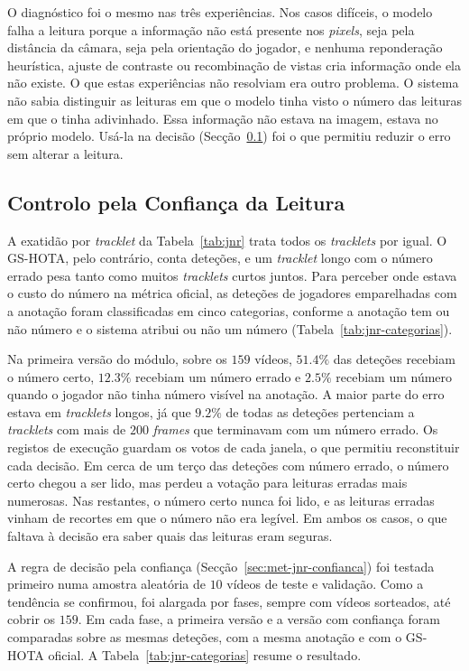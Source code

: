 O diagnóstico foi o mesmo nas três experiências. Nos casos difíceis, o modelo falha a leitura porque a informação não está presente nos \emph{pixels}, seja pela distância da câmara, seja pela orientação do jogador, e nenhuma reponderação heurística, ajuste de contraste ou recombinação de vistas cria informação onde ela não existe. O que estas experiências não resolviam era outro problema. O sistema não sabia distinguir as leituras em que o modelo tinha visto o número das leituras em que o tinha adivinhado. Essa informação não estava na imagem, estava no próprio modelo. Usá-la na decisão (Secção~\ref{sec:res_jnr_confianca}) foi o que permitiu reduzir o erro sem alterar a leitura.

\subsection{Controlo pela Confiança da Leitura}\label{sec:res_jnr_confianca}

A exatidão por \emph{tracklet} da Tabela~\ref{tab:jnr} trata todos os \emph{tracklets} por igual. O GS-HOTA, pelo contrário, conta deteções, e um \emph{tracklet} longo com o número errado pesa tanto como muitos \emph{tracklets} curtos juntos. Para perceber onde estava o custo do número na métrica oficial, as deteções de jogadores emparelhadas com a anotação foram classificadas em cinco categorias, conforme a anotação tem ou não número e o sistema atribui ou não um número (Tabela~\ref{tab:jnr-categorias}).

Na primeira versão do módulo, sobre os $159$ vídeos, $51.4\%$ das deteções recebiam o número certo, $12.3\%$ recebiam um número errado e $2.5\%$ recebiam um número quando o jogador não tinha número visível na anotação. A maior parte do erro estava em \emph{tracklets} longos, já que $9.2\%$ de todas as deteções pertenciam a \emph{tracklets} com mais de $200$ \emph{frames} que terminavam com um número errado. Os registos de execução guardam os votos de cada janela, o que permitiu reconstituir cada decisão. Em cerca de um terço das deteções com número errado, o número certo chegou a ser lido, mas perdeu a votação para leituras erradas mais numerosas. Nas restantes, o número certo nunca foi lido, e as leituras erradas vinham de recortes em que o número não era legível. Em ambos os casos, o que faltava à decisão era saber quais das leituras eram seguras.

A regra de decisão pela confiança (Secção~\ref{sec:met-jnr-confianca}) foi testada primeiro numa amostra aleatória de $10$ vídeos de teste e validação. Como a tendência se confirmou, foi alargada por fases, sempre com vídeos sorteados, até cobrir os $159$. Em cada fase, a primeira versão e a versão com confiança foram comparadas sobre as mesmas deteções, com a mesma anotação e com o GS-HOTA oficial. A Tabela~\ref{tab:jnr-categorias} resume o resultado.

